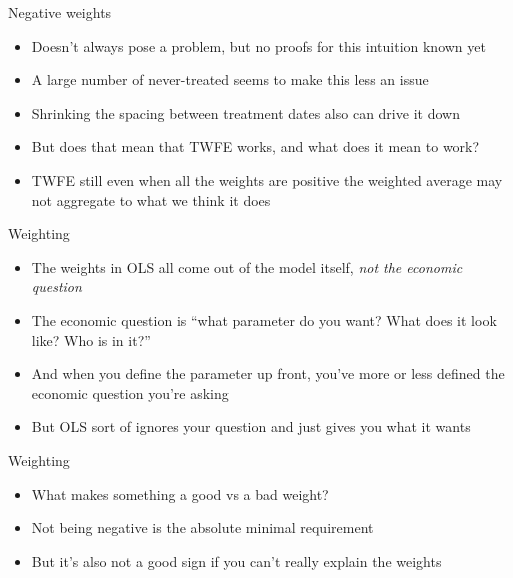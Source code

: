 \documentclass{beamer}
\begin{document}
\begin{frame}{Negative weights}

\begin{itemize}
\item Doesn't always pose a problem, but no proofs for this intuition known yet
\item A large number of never-treated seems to make this less an issue
\item Shrinking the spacing between treatment dates also can drive it down
\item But does that mean that TWFE works, and what does it mean to work?
\item TWFE still even when all the weights are positive the weighted average may not aggregate to what we think it does
\end{itemize}

\end{frame}

\begin{frame}{Weighting}

\begin{itemize}
\item The weights in OLS all come out of the model itself, \emph{not the economic question}
\item The economic question is ``what parameter do you want? What does it look like? Who is in it?''
\item And when you define the parameter up front, you've more or less defined the economic question you're asking
\item But OLS sort of ignores your question and just gives you what it wants
\end{itemize}

\end{frame}

\begin{frame}{Weighting}

\begin{itemize}
\item What makes something a good vs a bad weight?
\item Not being negative is the absolute minimal requirement
\item But it's also not a good sign if you can't really explain the weights
\end{itemize}

\end{frame}
\end{document}
